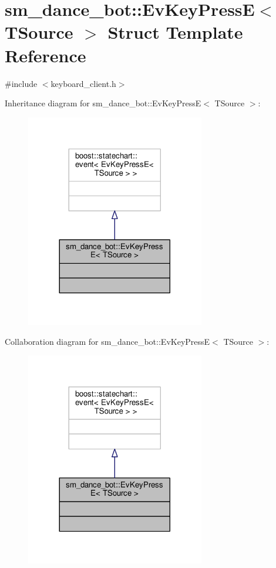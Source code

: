 \hypertarget{structsm__dance__bot_1_1EvKeyPressE}{}\section{sm\+\_\+dance\+\_\+bot\+:\+:Ev\+Key\+PressE$<$ T\+Source $>$ Struct Template Reference}
\label{structsm__dance__bot_1_1EvKeyPressE}


{\ttfamily \#include $<$keyboard\+\_\+client.\+h$>$}



Inheritance diagram for sm\+\_\+dance\+\_\+bot\+:\+:Ev\+Key\+PressE$<$ T\+Source $>$\+:
\nopagebreak
\begin{figure}[H]
\begin{center}
\leavevmode
\includegraphics[width=221pt]{structsm__dance__bot_1_1EvKeyPressE__inherit__graph}
\end{center}
\end{figure}


Collaboration diagram for sm\+\_\+dance\+\_\+bot\+:\+:Ev\+Key\+PressE$<$ T\+Source $>$\+:
\nopagebreak
\begin{figure}[H]
\begin{center}
\leavevmode
\includegraphics[width=221pt]{structsm__dance__bot_1_1EvKeyPressE__coll__graph}
\end{center}
\end{figure}


